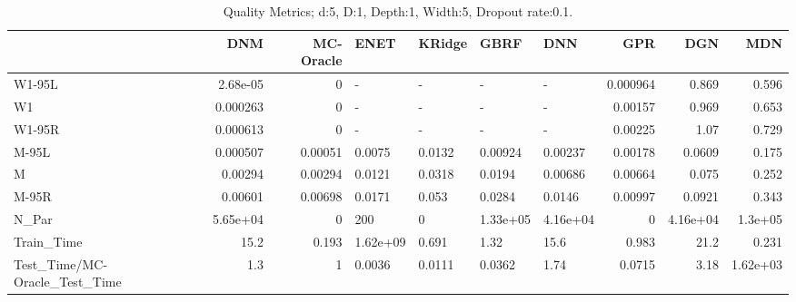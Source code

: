 \begin{table}
\centering
\caption{Quality Metrics; d:5, D:1, Depth:1, Width:5, Dropout rate:0.1.}
\begin{tabular}{lrrllllrrr}
\toprule
{} &      DNM &  MC-Oracle &     ENET & KRidge &     GBRF &      DNN &      GPR &      DGN &      MDN \\
\midrule
W1-95L                        & 2.68e-05 &          0 &        - &      - &        - &        - & 0.000964 &    0.869 &    0.596 \\
W1                            & 0.000263 &          0 &        - &      - &        - &        - &  0.00157 &    0.969 &    0.653 \\
W1-95R                        & 0.000613 &          0 &        - &      - &        - &        - &  0.00225 &     1.07 &    0.729 \\
M-95L                         & 0.000507 &    0.00051 &   0.0075 & 0.0132 &  0.00924 &  0.00237 &  0.00178 &   0.0609 &    0.175 \\
M                             &  0.00294 &    0.00294 &   0.0121 & 0.0318 &   0.0194 &  0.00686 &  0.00664 &    0.075 &    0.252 \\
M-95R                         &  0.00601 &    0.00698 &   0.0171 &  0.053 &   0.0284 &   0.0146 &  0.00997 &   0.0921 &    0.343 \\
N\_Par                         & 5.65e+04 &          0 &      200 &      0 & 1.33e+05 & 4.16e+04 &        0 & 4.16e+04 &  1.3e+05 \\
Train\_Time                    &     15.2 &      0.193 & 1.62e+09 &  0.691 &     1.32 &     15.6 &    0.983 &     21.2 &    0.231 \\
Test\_Time/MC-Oracle\_Test\_Time &      1.3 &          1 &   0.0036 & 0.0111 &   0.0362 &     1.74 &   0.0715 &     3.18 & 1.62e+03 \\
\bottomrule
\end{tabular}
\end{table}
